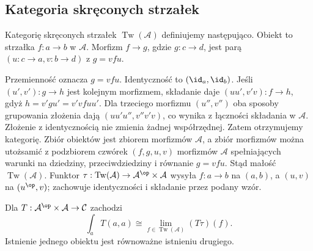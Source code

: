 \subsection{Kategoria skręconych strzałek}
\begin{definicja}\label{cat:def:twisted-arrow}
Kategorię skręconych strzałek $\operatorname{Tw}(\mathcal A)$ definiujemy następująco. Obiekt to strzałka $f:a\to b$ w $\mathcal A$. Morfizm $f\to g$, gdzie $g:c\to d$, jest parą $(u:c\to a,v:b\to d)$ z $g=vfu$.
\begin{center}
\end{center}
Przemienność oznacza $g=vfu$.
Identyczność to $(\id_a,\id_b)$. Jeśli $(u',v'):g\to h$ jest kolejnym morfizmem, składanie daje $(uu',v'v):f\to h$, gdyż $h=v'gu'=v'v fuu'$. Dla trzeciego morfizmu $(u'',v'')$ oba sposoby grupowania złożenia dają $(uu'u'',v''v'v)$, co wynika z łączności składania w $\mathcal A$. Złożenie z identycznością nie zmienia żadnej współrzędnej. Zatem otrzymujemy kategorię. Zbiór obiektów jest zbiorem morfizmów $\mathcal A$, a zbiór morfizmów można utożsamić z podzbiorem czwórek $(f,g,u,v)$ morfizmów $\mathcal A$ spełniających warunki na dziedziny, przeciwdziedziny i równanie $g=vfu$. Stąd małość $\operatorname{Tw}(\mathcal A)$. Funktor $\tau:\operatorname{Tw}(\mathcal A)\to\mathcal A^{\op}\times\mathcal A$ wysyła $f:a\to b$ na $(a,b)$, a $(u,v)$ na $(u^{\op},v)$; zachowuje identyczności i składanie przez podany wzór.
\end{definicja}
\begin{twierdzenie}\label{cat:thm:end-twisted}
Dla $T:\mathcal A^{\op}\times\mathcal A\to\mathcal C$ zachodzi
\[
 \int_a T(a,a)\cong
 \lim_{f\in\operatorname{Tw}(\mathcal A)} (T\tau)(f).
\]
Istnienie jednego obiektu jest równoważne istnieniu drugiego.
\end{twierdzenie}
